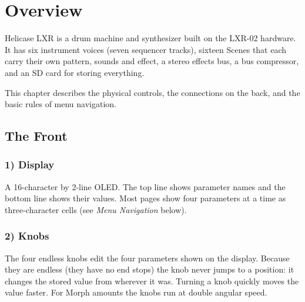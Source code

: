 \section{Overview}\label{overview}

Helicase LXR is a drum machine and synthesizer built on the LXR-02
hardware. It has six instrument voices (seven sequencer tracks), sixteen
Scenes that each carry their own pattern, sounds and effect, a stereo
effects bus, a bus compressor, and an SD card for storing everything.

This chapter describes the physical controls, the connections on the
back, and the basic rules of menu navigation.


\subsection{The Front}\label{the-front}


\subsubsection{1) Display}\label{display}

A 16-character by 2-line OLED. The top line shows parameter names and
the bottom line shows their values. Most pages show four parameters at a
time as three-character cells (see \emph{Menu Navigation} below).

\subsubsection{2) Knobs}\label{knobs}

The four endless knobs edit the four parameters shown on the display.
Because they are endless (they have no end stops) the knob never jumps
to a position: it changes the stored value from wherever it was. Turning
a knob quickly moves the value faster. For Morph amounts the knobs run
at double angular speed.

